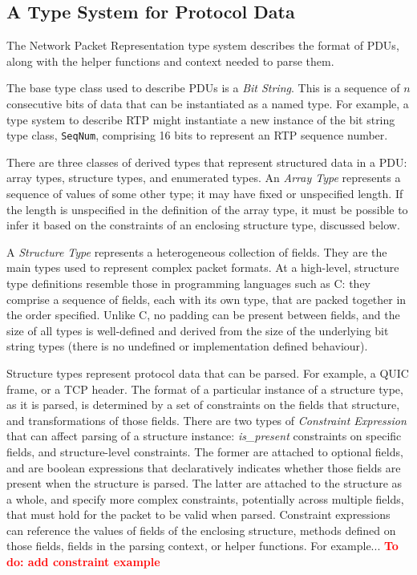 \documentclass[10pt,sigconf]{acmart}
\newcommand{\todo}[1]{\textbf{\textcolor{red}{To do: #1}}}
\begin{document}
\subsection{A Type System for Protocol Data}
\label{sec:npr-types}

The Network Packet Representation type system describes the format of PDUs,
along with the helper functions and context needed to parse them.

The base type class used to describe PDUs is a \emph{Bit String}.
This is a sequence of $n$ consecutive bits of data that can be instantiated
as a named type.
For example, a type system to describe RTP \cite{RFC3550} might instantiate
a new instance of the bit string type class, \texttt{SeqNum}, comprising 16
bits to represent an RTP sequence number.

There are three classes of derived types that represent structured data in
a PDU: array types, structure types, and enumerated types.
An \emph{Array Type} represents a sequence of values of some other type; 
it may have fixed or unspecified length. If the length is unspecified in
the definition of the array type, it must be possible to infer it based
on the constraints of an enclosing structure type, discussed below.

A \emph{Structure Type} represents a heterogeneous collection of fields.
They are the main types used to represent complex packet formats.
At a high-level, structure type definitions resemble those in programming
languages such as C: they comprise a sequence of fields, each with its own
type, that are packed together in the order specified. Unlike C, no padding
can be present between fields, and the size of all types is well-defined
and derived from the size of the underlying bit string types (there is no
undefined or implementation defined behaviour).

Structure types represent protocol data that can be parsed.
For example, a QUIC frame, or a TCP header.
The format of a particular instance of a structure type, as it is parsed,
is determined by a set of constraints on the fields that structure, and
transformations of those fields. 
There are two types of \emph{Constraint Expression} that can affect parsing
of a structure instance: \emph{is\_present} constraints on specific fields,
and structure-level constraints.
The former are attached to optional fields, and are boolean expressions
that declaratively indicates whether those fields are present when the
structure is parsed.
The latter are attached to the structure as a whole, and specify more
complex constraints, potentially across multiple fields, that must hold
for the packet to be valid when parsed. 
Constraint expressions can reference the values of fields of the enclosing
structure, methods defined on those fields, fields in the parsing context,
or helper functions. 
For example... \todo{add constraint example}
\end{document}
